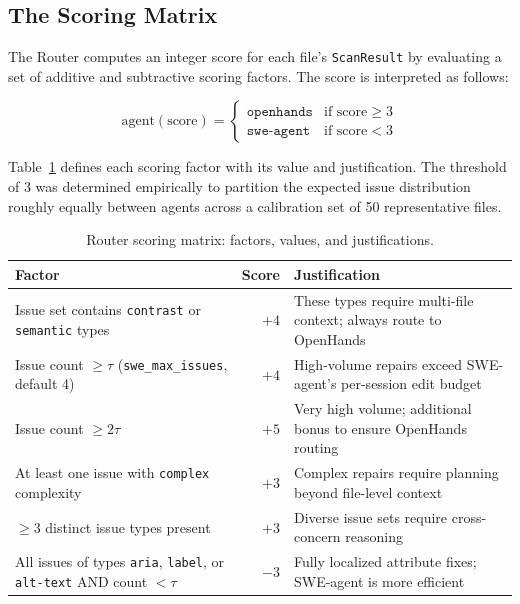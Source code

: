 \subsection{The Scoring Matrix}

The Router computes an integer score for each file's \texttt{ScanResult} by
evaluating a set of additive and subtractive scoring factors.  The score is
interpreted as follows:

\begin{equation}
  \text{agent}(\text{score}) =
  \begin{cases}
    \texttt{openhands} & \text{if score} \geq 3 \\
    \texttt{swe-agent} & \text{if score} < 3
  \end{cases}
  \label{eq:routing}
\end{equation}

Table~\ref{tab:scoring} defines each scoring factor with its value and
justification.  The threshold of 3 was determined empirically to partition the
expected issue distribution roughly equally between agents across a calibration
set of 50 representative files.

\begin{table}[htbp]
\caption{Router scoring matrix: factors, values, and justifications.}
\label{tab:scoring}
\centering\small
\renewcommand{\arraystretch}{1.3}
\begin{tabular}{p{}rp{}}
\toprule
\textbf{Factor} & \textbf{Score} & \textbf{Justification} \\
\midrule
Issue set contains \texttt{contrast} or \texttt{semantic} types
  & $+4$ & These types require multi-file context; always route to OpenHands \\
Issue count $\geq \tau$ (\texttt{swe\_max\_issues}, default 4)
  & $+4$ & High-volume repairs exceed SWE-agent's per-session edit budget \\
Issue count $\geq 2\tau$
  & $+5$ & Very high volume; additional bonus to ensure OpenHands routing \\
At least one issue with \texttt{complex} complexity
  & $+3$ & Complex repairs require planning beyond file-level context \\
$\geq$3 distinct issue types present
  & $+3$ & Diverse issue sets require cross-concern reasoning \\
All issues of types \texttt{aria}, \texttt{label}, or \texttt{alt-text} AND count $< \tau$
  & $-3$ & Fully localized attribute fixes; SWE-agent is more efficient \\
\bottomrule
\end{tabular}
\end{table}

